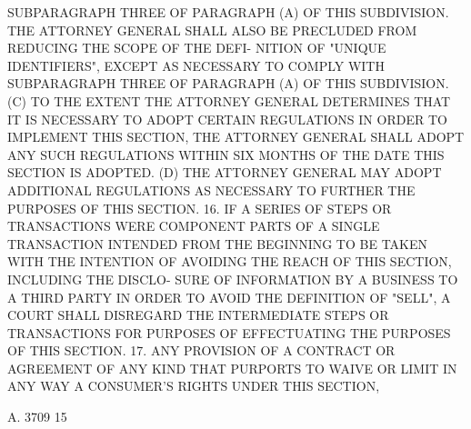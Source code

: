  SUBPARAGRAPH  THREE  OF  PARAGRAPH (A) OF THIS SUBDIVISION. THE ATTORNEY
 GENERAL SHALL ALSO BE PRECLUDED FROM REDUCING THE  SCOPE  OF  THE  DEFI-
 NITION  OF  "UNIQUE  IDENTIFIERS",  EXCEPT  AS  NECESSARY TO COMPLY WITH
 SUBPARAGRAPH THREE OF PARAGRAPH (A) OF THIS SUBDIVISION.
   (C) TO THE EXTENT THE ATTORNEY GENERAL DETERMINES THAT IT IS NECESSARY
 TO ADOPT CERTAIN REGULATIONS IN ORDER TO  IMPLEMENT  THIS  SECTION,  THE
 ATTORNEY  GENERAL  SHALL ADOPT ANY SUCH REGULATIONS WITHIN SIX MONTHS OF
 THE DATE THIS SECTION IS ADOPTED.
   (D) THE ATTORNEY GENERAL MAY ADOPT ADDITIONAL REGULATIONS AS NECESSARY
 TO FURTHER THE PURPOSES OF THIS SECTION.
   16. IF A SERIES OF STEPS OR TRANSACTIONS WERE  COMPONENT  PARTS  OF  A
 SINGLE  TRANSACTION  INTENDED  FROM  THE  BEGINNING TO BE TAKEN WITH THE
 INTENTION OF AVOIDING THE REACH OF THIS SECTION, INCLUDING  THE  DISCLO-
 SURE OF INFORMATION BY A BUSINESS TO A THIRD PARTY IN ORDER TO AVOID THE
 DEFINITION  OF "SELL", A COURT SHALL DISREGARD THE INTERMEDIATE STEPS OR
 TRANSACTIONS FOR PURPOSES OF EFFECTUATING THE PURPOSES OF THIS SECTION.
   17. ANY PROVISION OF A CONTRACT OR AGREEMENT OF ANY KIND THAT PURPORTS
 TO WAIVE OR LIMIT IN ANY WAY A CONSUMER'S  RIGHTS  UNDER  THIS  SECTION,

 A. 3709                            15
 
